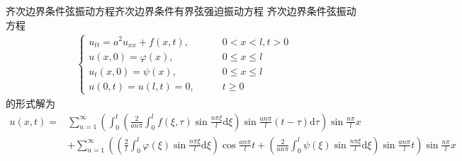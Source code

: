 \documentclass[lang = cn, scheme = chinese, thmcnt = section]{elegantbook}
\newcommand{\dd}{\mathrm{d}}           %
\begin{document}
\begin{theorem}{齐次边界条件弦振动方程}{齐次边界条件有界弦强迫振动方程}
	齐次边界条件弦振动方程
	\begin{align*}\label{齐次边界条件有界弦强迫振动方程}
		\begin{cases}
			u_{tt}=a^2u_{xx}+f(x,t),\qquad & 0<x<l,t>0\\
			u(x,0)=\varphi(x),\qquad & 0\le x \le l\\
			u_t(x,0)=\psi(x),\qquad & 0\le x \le l\\
			u(0,t)=u(l,t)=0,\qquad & t\ge 0
		\end{cases}\tag{*}
	\end{align*}
	的形式解为
	\begin{align*}
		u(x,t)
		= & \sum_{n=1}^{\infty}\left(\int_{0}^{t}\left(\frac{2}{an\pi}\int_0^lf(\xi,\tau)\sin\frac{n\pi \xi}{l}\dd \xi\right)\sin \frac{an\pi}{l}(t-\tau)\dd \tau\right)\sin\frac{n\pi}{l}x\\
		& + \sum_{n=1}^{\infty}\left(\left(\frac{2}{l}\int_0^l\varphi(\xi)\sin\frac{n\pi \xi}{l}\dd \xi\right)\cos\frac{an\pi}{l}t+\left(\frac{2}{an\pi}\int_0^l\psi(\xi)\sin\frac{n\pi \xi}{l}\dd \xi\right)\sin \frac{an\pi}{l}t\right)\sin\frac{n\pi}{l}x
	\end{align*}
\end{theorem}
\end{document}
